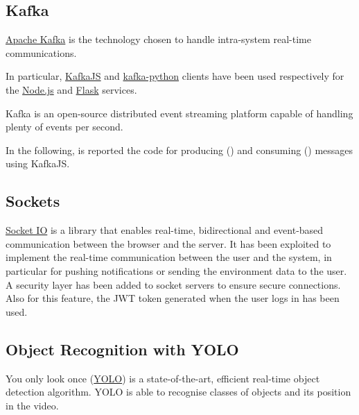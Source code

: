 \documentclass{scrartcl}
\begin{document}
    \subsection{Kafka}

    \href{https://kafka.apache.org}{Apache Kafka} is the technology chosen to handle intra-system real-time communications.

    In particular, \href{https://kafka.js.org}{KafkaJS} and \href{https://kafka-python.readthedocs.io/en/master/}{kafka-python} clients
    have been used respectively for the \href{https://nodejs.org/en}{Node.js} and \href{https://flask.palletsprojects.com/en/3.0.x/}{Flask} services.

    Kafka is an open-source distributed event streaming platform capable of handling plenty of events per second.

    In the following, is reported the code for producing () and consuming () messages using KafkaJS.

    

    

    \subsection{Sockets}
    \href{https://socket.io/}{Socket IO} is a library that enables real-time, bidirectional and event-based communication between the browser and the server.
    It has been exploited to implement the real-time communication between the user and the system, in particular for pushing notifications or sending the environment data to the user.
    A security layer has been added to socket servers to ensure secure connections.
    Also for this feature, the JWT token generated when the user logs in has been used.

    

    \subsection{Object Recognition with YOLO}
    You only look once (\href{https://pjreddie.com/darknet/yolo}{YOLO}) is a state-of-the-art, efficient real-time object detection algorithm.
    YOLO is able to recognise classes of objects and its position in the video.
\end{document}
